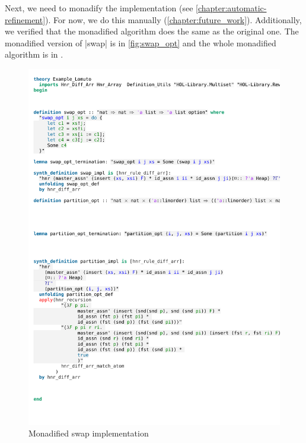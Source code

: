 \noindent Next, we need to monadify the implementation (see \autoref{chapter:automatic-refinement}). For now, we do this manually (\autoref{chapter:future_work}). Additionally, we verified that the monadified algorithm does the same as the original one. The monadified version of |swap| is in \autoref{fig:swap_opt} and the whole monadified algorithm is in \cite{repo}.

\begin{figure}[htbp]
    \includegraphics[trim={0 21,7cm 0 3,4cm}, clip, width=1.00\textwidth]{figures/Theory_Example_Lomuto_Translatiopn.pdf}
    \caption[Monadified swap implementation]{Monadified swap implementation}
    \label{fig:swap_opt}
\end{figure}

